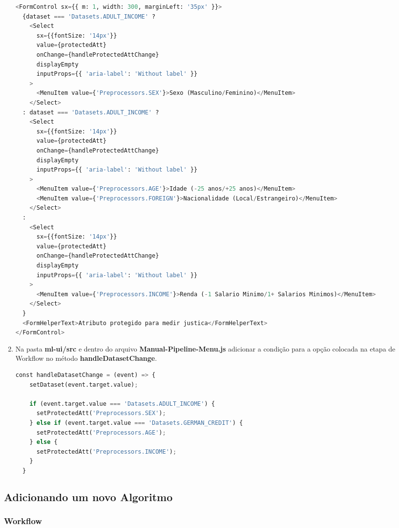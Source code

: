\documentclass[Portugues,Final]{ic-tese-v3}
\begin{document}
\begin{enumerate}
\begin{lstlisting}[language=Python, label=cod:AddDatasetManual]
<FormControl sx={{ m: 1, width: 300, marginLeft: '35px' }}>
  {dataset === 'Datasets.ADULT_INCOME' ?
    <Select
      sx={{fontSize: '14px'}}
      value={protectedAtt}
      onChange={handleProtectedAttChange}
      displayEmpty
      inputProps={{ 'aria-label': 'Without label' }}
    >
      <MenuItem value={'Preprocessors.SEX'}>Sexo (Masculino/Feminino)</MenuItem>
    </Select>
  : dataset === 'Datasets.ADULT_INCOME' ?
    <Select
      sx={{fontSize: '14px'}}
      value={protectedAtt}
      onChange={handleProtectedAttChange}
      displayEmpty
      inputProps={{ 'aria-label': 'Without label' }}
    >
      <MenuItem value={'Preprocessors.AGE'}>Idade (-25 anos/+25 anos)</MenuItem>
      <MenuItem value={'Preprocessors.FOREIGN'}>Nacionalidade (Local/Estrangeiro)</MenuItem>
    </Select>
  :
    <Select
      sx={{fontSize: '14px'}}
      value={protectedAtt}
      onChange={handleProtectedAttChange}
      displayEmpty
      inputProps={{ 'aria-label': 'Without label' }}
    >
      <MenuItem value={'Preprocessors.INCOME'}>Renda (-1 Salario Minimo/1+ Salarios Minimos)</MenuItem>
    </Select>
  }
  <FormHelperText>Atributo protegido para medir justica</FormHelperText>
</FormControl>
\end{lstlisting}

\item Na pasta \textbf{ml-ui/src} e dentro do arquivo \textbf{Manual-Pipeline-Menu.js} adicionar a condição para a opção colocada na etapa de Workflow no método \textbf{handleDatasetChange}.

\begin{lstlisting}[language=Python, label=cod:AddDatasetManual]
  const handleDatasetChange = (event) => {
    setDataset(event.target.value);

    if (event.target.value === 'Datasets.ADULT_INCOME') {
      setProtectedAtt('Preprocessors.SEX');
    } else if (event.target.value === 'Datasets.GERMAN_CREDIT') {
      setProtectedAtt('Preprocessors.AGE');
    } else {
      setProtectedAtt('Preprocessors.INCOME');
    }
  }
\end{lstlisting}
\end{enumerate}

\subsection{Adicionando um novo Algoritmo}

\subsubsection{Workflow}
\end{document}
